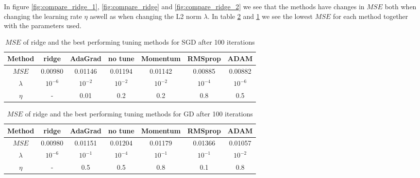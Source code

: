 \documentclass[11pt]{article}
\begin{document}
In figure  \ref{fig:compare_ridge_1}, \ref{fig:compare_ridge} and \ref{fig:compare_ridge_2} we see that the methods have changes in $MSE$ both when changing the learning rate $\eta$ aswell as when changing the L2 norm $\lambda$. In table \ref{tab:ridge_compare_GD} and \ref{tab:ridge_compare_SGD} we see the lowest $MSE$ for each method together with the parameters used.
\begin{table}[H]
    \centering
    \caption{$MSE$ of ridge and the best performing tuning methods for SGD after 100 iterations}
    \label{tab:ridge_compare_SGD}
    \begin{tabular}{|c|c|c|c|c|c|c|}
        \hline
        Method    & ridge     & AdaGrad   & no tune   & Momentum  & RMSprop   & ADAM      \\
        \hline
        $MSE$     & 0.00980   & 0.01146   & 0.01194   & 0.01142   & 0.00885   & 0.00882   \\
        \hline
        $\lambda$ & $10^{-6}$ & $10^{-2}$ & $10^{-2}$ & $10^{-2}$ & $10^{-4}$ & $10^{-6}$ \\
        \hline
        $\eta$    & -         & 0.01      & 0.2       & 0.2       & 0.8       & 0.5       \\
        \hline
    \end{tabular}
\end{table}
\begin{table}[H]
    \centering
    \caption{$MSE$ of ridge and the best performing tuning methods for GD after 100 iterations}
    \label{tab:ridge_compare_GD}
    \begin{tabular}{|c|c|c|c|c|c|c|}
        \hline
        Method    & ridge     & AdaGrad   & no tune   & Momentum  & RMSprop   & ADAM      \\
        \hline
        $MSE$     & 0.00980   & 0.01151   & 0.01204   & 0.01179   & 0.01366   & 0.01057   \\
        \hline
        $\lambda$ & $10^{-6}$ & $10^{-1}$ & $10^{-4}$ & $10^{-1}$ & $10^{-1}$ & $10^{-2}$ \\
        \hline
        $\eta$    & -         & 0.5       & 0.5       & 0.8       & 0.1       & 0.8       \\
        \hline
    \end{tabular}
\end{table}
\end{document}
